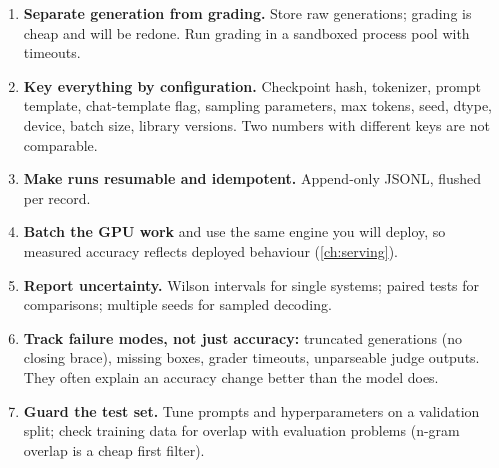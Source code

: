 \begin{enumerate}
  \item \textbf{Separate generation from grading.} Store raw generations; grading is cheap and
  will be redone. Run grading in a sandboxed process pool with timeouts.
  \item \textbf{Key everything by configuration.} Checkpoint hash, tokenizer, prompt template,
  chat-template flag, sampling parameters, max tokens, seed, dtype, device, batch size, library
  versions. Two numbers with different keys are not comparable.
  \item \textbf{Make runs resumable and idempotent.} Append-only JSONL, flushed per record.
  \item \textbf{Batch the GPU work} and use the same engine you will deploy, so measured accuracy
  reflects deployed behaviour (\cref{ch:serving}).
  \item \textbf{Report uncertainty.} Wilson intervals for single systems; paired tests for
  comparisons; multiple seeds for sampled decoding.
  \item \textbf{Track failure modes, not just accuracy:} truncated generations (no closing brace),
  missing boxes, grader timeouts, unparseable judge outputs. They often explain an accuracy change
  better than the model does.
  \item \textbf{Guard the test set.} Tune prompts and hyperparameters on a validation split;
  check training data for overlap with evaluation problems (n-gram overlap is a cheap first filter).
\end{enumerate}

